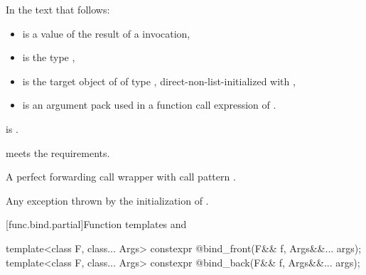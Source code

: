 \begin{itemdescr}
\pnum
In the text that follows:
\begin{itemize}
\item {} is a value of the result of a  invocation,
\item {} is the type ,
\item {} is the target object of 
  of type ,
  direct-non-list-initialized with ,
\item {} is an argument pack
  used in a function call expression of .
\end{itemize}

\pnum
\mandates
{}
is .

\pnum
\expects
{} meets the  requirements.

\pnum
\returns
A perfect forwarding call wrapper 
with call pattern .

\pnum
\throws
Any exception thrown by the initialization of .
\end{itemdescr}

[func.bind.partial]{Function templates  and }

%
%
\begin{itemdecl}
template<class F, class... Args>
  constexpr @\unspec@ bind_front(F&& f, Args&&... args);
template<class F, class... Args>
  constexpr @\unspec@ bind_back(F&& f, Args&&... args);
\end{itemdecl}

